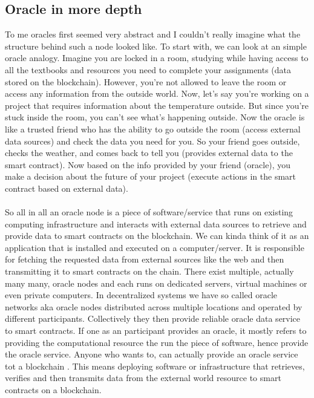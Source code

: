 \documentclass{article}
\begin{document}
\subsection{Oracle in more depth}
To me oracles first seemed very abstract and I couldn't really imagine what the structure behind such a node looked like. To start with, we can look at an simple oracle analogy. Imagine you are locked in a room, studying while having access to all the textbooks and resources you need to complete your assignments (data stored on the blockchain). However, you're not allowed to leave the room or access any information from the outside world. Now, let's say you're working on a project that requires information about the temperature outside. But since you're stuck inside the room, you can't see what's happening outside. Now the oracle is like a trusted friend who has the ability to go outside the room (access external data sources) and check the data you need for you. So your friend goes outside, checks the weather, and comes back to tell you (provides external data to the smart contract). Now based on the info provided by your friend (oracle), you make a decision about the future of your project (execute actions in the smart contract based on external data).
\\
\\
So all in all an oracle node is a piece of software/service that runs on existing computing infrastructure and interacts with external data sources to retrieve and provide data to smart contracts on the blockchain. We can kinda think of it as an application that is installed and executed on a computer/server. It is responsible for fetching the requested data from external sources like the web and then transmitting it to smart contracts on the chain. There exist multiple, actually many many, oracle nodes and each runs on dedicated servers, virtual machines or even private computers. In decentralized systems we have so called oracle networks aka oracle nodes distributed across multiple locations and operated by different participants. Collectively they then provide reliable oracle data service to smart contracts. If one as an participant provides an oracle, it mostly refers to providing the computational resource the run the piece of software, hence provide the oracle service. Anyone who wants to, can actually provide an oracle service tot  a blockchain . This means deploying software or infrastructure that retrieves, verifies and then transmits data from the external world resource to smart contracts on a blockchain. 
\end{document}
